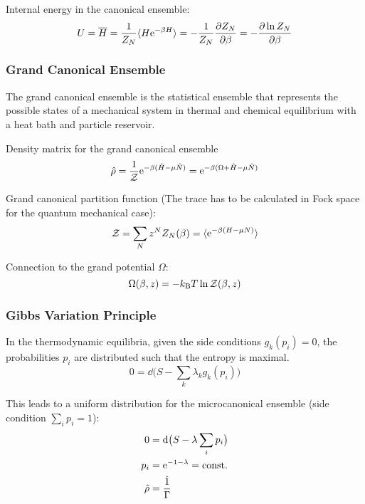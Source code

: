 			\noindent
			Internal energy in the canonical ensemble:
			\begin{equation}
				U = \overline{H} = \frac{1}{Z_N}\langle H\mathrm{e}^{-\beta H}\rangle = -\frac{1}{Z_N}\pdv{Z_N}{\beta} = -\pdv{\ln Z_N}{\beta}
			\end{equation}

		\subsubsection{Grand Canonical Ensemble}
			The grand canonical ensemble is the statistical ensemble that represents the possible states of a mechanical system in thermal and chemical equilibrium with a heat bath and particle reservoir.

			Density matrix for the grand canonical ensemble
			\begin{equation}
				\hat{\rho} = \frac{1}{\mathcal{Z}} \mathrm{e}^{-\beta (\hat{H} - \mu \hat{N})}
				= \mathrm{e}^{-\beta (\Omega + \hat{H} - \mu \hat{N})}
			\end{equation}

			Grand canonical partition function (The trace has to be calculated in Fock space for the quantum mechanical case):
			\begin{equation}
				\mathcal{Z} = \sum_N z^N Z_N(\beta) = \langle \mathrm{e}^{-\beta(H-\mu N)} \rangle
			\end{equation}

			\noindent
			Connection to the grand potential $\Omega$:
			\begin{equation}
				\Omega(\beta,z) = -k_{\text{B}} T \ln \mathcal{Z}(\beta,z)
			\end{equation}


		\subsubsection{Gibbs Variation Principle}
			\noindent
			In the thermodynamic equilibria, given the side conditions $g_k(p_i) = 0$, the probabilities $p_i$ are distributed such that the entropy is maximal.
			\begin{equation}
				0 = \dd \big( S - \sum_k \lambda_k g_k(p_i) \big)
			\end{equation}

			\noindent
			This leads to a uniform distribution for the microcanonical ensemble (side condition $\sum_i p_i = 1$):
			\begin{equation}
				\begin{aligned}
					0 &= \dd \big( S - \lambda \sum_i p_i \big) \\
					p_i &= \mathrm{e}^{-1-\lambda} = \mathrm{const.} \\
					\hat{\rho} &= \frac{\hat{1}}{\Gamma} \\
				\end{aligned}
			\end{equation}

